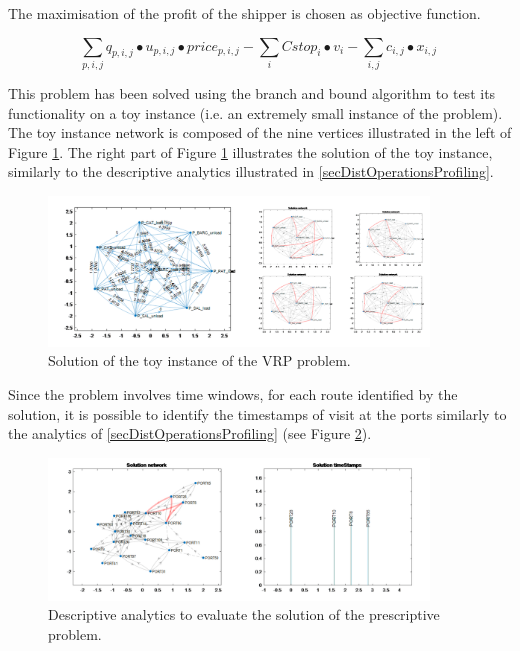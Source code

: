 The maximisation of the profit of the shipper is chosen as objective function.

\begin{equation}
\sum_{p,i,j}{q_{p,i,j}\bullet u_{p,i,j}\bullet p r i c e_{p,i,j}-\sum_{i}{Cstop_i\bullet v_i}-\sum_{i,j}{c_{i,j}\bullet x_{i,j}\ }}
\end{equation}

This problem has been solved using the branch and bound algorithm to test its functionality on a toy instance (i.e. an extremely small instance of the problem). The toy instance network is composed of the nine vertices illustrated in the left of Figure \ref{fig_vesselsOptimal}. The right part of Figure \ref{fig_vesselsOptimal} illustrates the solution of the toy instance, similarly to the descriptive analytics illustrated in \ref{secDistOperationsProfiling}.

\begin{figure}[hbt!]
\centering
\includegraphics[width=0.9\textwidth]{SectionDistribution/control_figures/fig_vesselsOptimal.png}
\captionsetup{type=figure}
\caption{Solution of the toy instance of the VRP problem.}
\label{fig_vesselsOptimal}
\end{figure}

Since the problem involves time windows, for each route identified by the solution, it is possible to identify the timestamps of visit at the ports similarly to the analytics of \ref{secDistOperationsProfiling} (see Figure \ref{fig_vesselInventory}). 

\begin{figure}[hbt!]
\centering
\includegraphics[width=0.9\textwidth]{SectionDistribution/control_figures/fig_vesselInventory.png}
\captionsetup{type=figure}
\caption{Descriptive analytics to evaluate the solution of the prescriptive problem.}
\label{fig_vesselInventory}
\end{figure}

